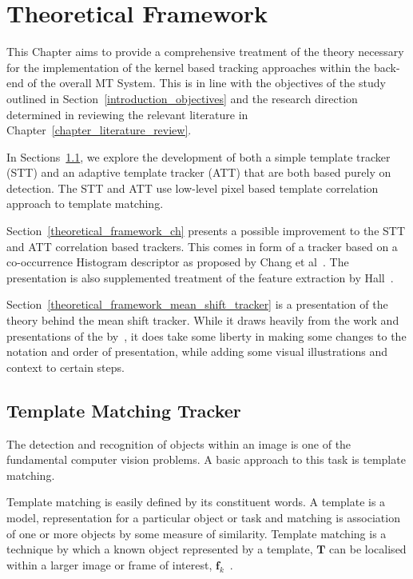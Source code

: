 \chapter{Theoretical Framework}\label{chapter_theoretical_framework}
This Chapter aims to provide a comprehensive treatment of the theory necessary
for the implementation of the kernel based tracking approaches within the
back-end of the overall MT System. This is in line with the objectives
of the study outlined in
Section~\ref{introduction_objectives} and the research direction determined in
reviewing the relevant literature in Chapter~\ref{chapter_literature_review}.

In Sections~\ref{theoretical_framework_tm}, we explore the development of both a
simple template tracker (STT) and an adaptive template tracker (ATT) that are
both based purely on detection. The STT and ATT use low-level pixel based
template correlation approach to template matching.

Section~\ref{theoretical_framework_ch} presents a possible improvement to
the STT and ATT correlation based trackers. This comes in form of a tracker
based on a co-occurrence Histogram descriptor as proposed by Chang et
al~\cite{Chang1999}. The presentation is also supplemented treatment of the
feature extraction by Hall~\cite{Hall-beyer2018}.

Section~\ref{theoretical_framework_mean_shift_tracker} is a presentation of the
theory behind the mean shift tracker. While it draws heavily from the
work and presentations of the by~\cite{Comaniciu2002, Comaniciu2003,
Shah2011}, it does take some liberty in making some changes to the notation and
order of presentation, while adding some visual illustrations and
context to certain steps. 

\section{Template Matching Tracker}\label{theoretical_framework_tm}
The detection and recognition of objects within an image is one of the
fundamental computer vision problems. A basic approach to this task is template
matching.

Template matching is easily defined by its constituent words. A template is a
model, representation for a particular object or task and matching is
association of one or more objects by some measure of similarity. Template
matching is a technique by which a known object represented by a template,
$\mathbf{T}$ can be localised within a larger image or frame of interest,
$\mathbf{f}_k$~\cite{Brunelli}.

